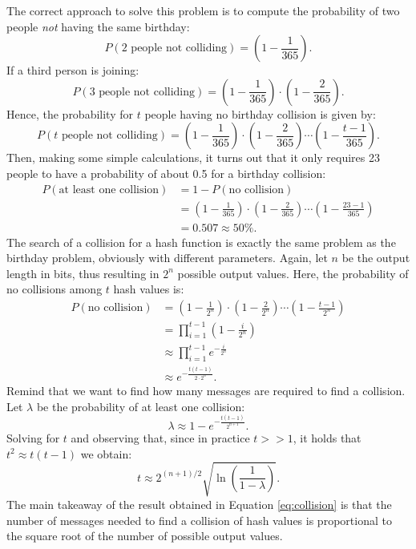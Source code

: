 \bigskip
\noindent
The correct approach to solve this problem is to compute the probability of two people \textit{not} having the same birthday:
$$P(\text{2 people not colliding}) = \left(1-\frac{1}{365} \right).$$
If a third person is joining:
$$P(\text{3 people not colliding}) = \left(1-\frac{1}{365} \right) \cdot \left(1-\frac{2}{365} \right).$$
Hence, the probability for $t$ people having no birthday collision is given by:
$$P(\text{$t$ people not colliding}) = \left(1-\frac{1}{365} \right) \cdot \left(1-\frac{2}{365} \right) \dotsm \left(1-\frac{t-1}{365} \right).$$
Then, making some simple calculations, it turns out that it only requires 23 people to have a probability of about 0.5 for a birthday collision:
\begin{equation*}
\begin{split}
    P(\text{at least one collision}) &= 1 - P(\text{no collision}) \\
            &= \left(1-\frac{1}{365} \right) \cdot \left(1-\frac{2}{365} \right) \dotsm \left(1-\frac{23-1}{365} \right) \\
            &= 0.507 \approx 50 \%.
\end{split}
\end{equation*}
The search of a collision for a hash function is exactly the same problem as the birthday problem, obviously with different parameters. Again, let $n$ be the output length in bits, thus resulting in $2^{n}$ possible output values. Here, the probability of no collisions among $t$ hash values is:
\begin{equation*}
\begin{split}
    P(\text{no collision}) &= \left(1-\frac{1}{2^{n}} \right) \cdot \left(1-\frac{2}{2^{n}} \right) \dotsm \left(1-\frac{t-1}{2^{n}} \right) \\
            &= \prod\limits_{i=1}^{t-1} \left(1-\frac{i}{2^{n}} \right) \\
            &\approx \prod\limits_{i=1}^{t-1} e^{- \frac{i}{2^{n}}} \\
            &\approx e^{- \frac{t(t-1)}{2\cdot 2^{n}}}.
\end{split}
\end{equation*}
Remind that we want to find how many messages are required to find a collision. Let $\lambda$ be the probability of at least one collision:
$$\lambda \approx 1 - e^{- \frac{t(t-1)}{2^{n+1}}}.$$
Solving for $t$ and observing that, since in practice $t>>1$, it holds that $t^{2}\approx t(t-1)$ we obtain:
\begin{equation}
    \label{eq:collision}
    t\approx 2^{(n+1)/2} \sqrt{\ln{\left(\frac{1}{1-\lambda}\right)}}.
\end{equation}
The main takeaway of the result obtained in Equation \ref{eq:collision} is that the number of messages needed to find a collision of hash values is proportional to the square root of the number of possible output values.

